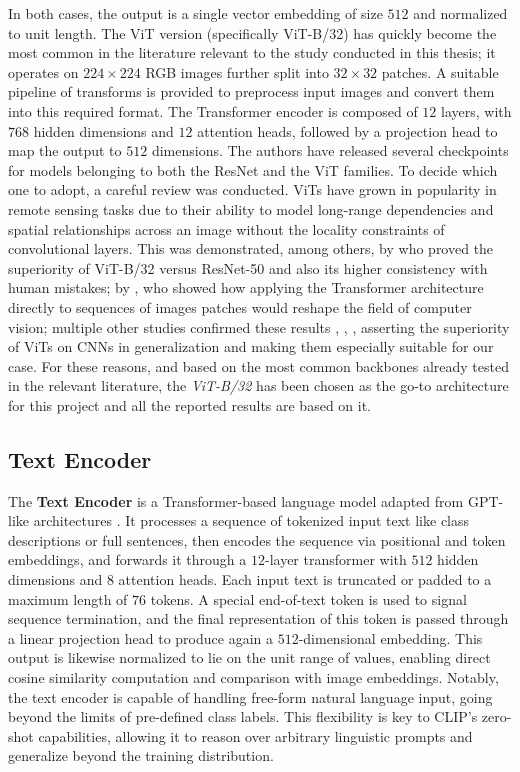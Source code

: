 \documentclass[a4paper, oneside, english]{sapthesis} %
\begin{document}
In both cases, the output is a single vector embedding of size $512$ and normalized to unit length. The ViT version (specifically ViT-B/32) has quickly become the most common in the literature relevant to the study conducted in this thesis; it operates on $224\times224$ RGB images further split into $32\times32$ patches. A suitable pipeline of transforms is provided to preprocess input images and convert them into this required format. The Transformer encoder is composed of $12$ layers, with $768$ hidden dimensions and $12$ attention heads, followed by a projection head to map the output to $512$ dimensions. The authors have released several checkpoints for models belonging to both the ResNet and the ViT families.
To decide which one to adopt, a careful review was conducted. ViTs have grown in popularity in remote sensing tasks due to their ability to model long-range dependencies and spatial relationships across an image without the locality constraints of convolutional layers. This was demonstrated, among others, by \cite{tuli2021convolutional} who proved the superiority of ViT-B/32 versus ResNet-50 and also its higher consistency with human mistakes; by \cite{dosovitskiy2020image}, who showed how applying the Transformer architecture directly to sequences of images patches would reshape the field of computer vision; multiple other studies confirmed these results \cite{deininger2022comparative}, \cite{hutten2022vision}, \cite{liu2024multivariate}, asserting the superiority of ViTs on CNNs in generalization and making them especially suitable for our case. For these reasons, and based on the most common backbones already tested in the relevant literature, the \emph{ViT-B/32} has been chosen as the go-to architecture for this project and all the reported results are based on it.

\subsection{Text Encoder}

The \textbf{Text Encoder} is a Transformer-based \cite{vaswani2017attention} language model adapted from GPT-like architectures \cite{radford2019language}. It processes a sequence of tokenized input text like class descriptions or full sentences, then encodes the sequence via positional and token embeddings, and forwards it through a $12$-layer transformer with $512$ hidden dimensions and $8$ attention heads. Each input text is truncated or padded to a maximum length of $76$ tokens. A special end-of-text token is used to signal sequence termination, and the final representation of this token is passed through a linear projection head to produce again a $512$-dimensional embedding. This output is likewise normalized to lie on the unit range of values, enabling direct cosine similarity computation and comparison with image embeddings.
Notably, the text encoder is capable of handling free-form natural language input, going beyond the limits of pre-defined class labels. This flexibility is key to CLIP’s zero-shot capabilities, allowing it to reason over arbitrary linguistic prompts and generalize beyond the training distribution.
\end{document}
